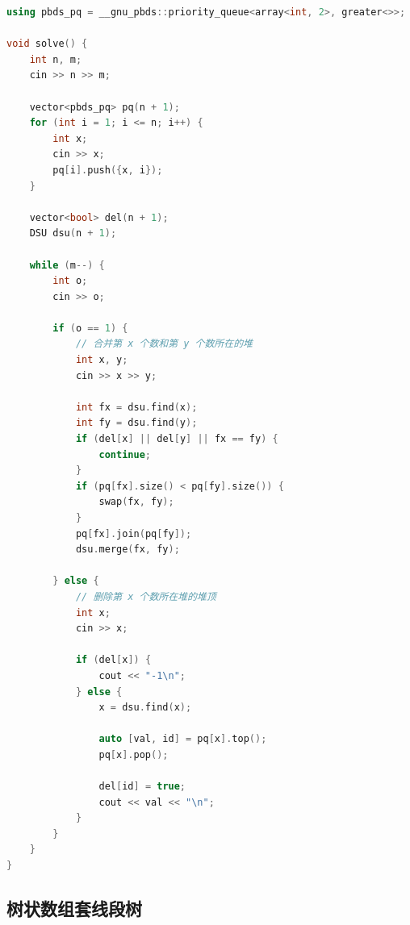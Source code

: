\begin{lstlisting}[language=C++]
using pbds_pq = __gnu_pbds::priority_queue<array<int, 2>, greater<>>;

void solve() {
    int n, m;
    cin >> n >> m;
    
    vector<pbds_pq> pq(n + 1);
    for (int i = 1; i <= n; i++) {
        int x;
        cin >> x;
        pq[i].push({x, i});
    }
    
    vector<bool> del(n + 1);
    DSU dsu(n + 1);

    while (m--) {
        int o;
        cin >> o;
        
        if (o == 1) {
            // 合并第 x 个数和第 y 个数所在的堆
            int x, y;
            cin >> x >> y;
            
            int fx = dsu.find(x);
            int fy = dsu.find(y);
            if (del[x] || del[y] || fx == fy) {
                continue;
            }
            if (pq[fx].size() < pq[fy].size()) {
                swap(fx, fy);
            }
            pq[fx].join(pq[fy]);
            dsu.merge(fx, fy);

        } else {
            // 删除第 x 个数所在堆的堆顶
            int x;
            cin >> x;

            if (del[x]) {
                cout << "-1\n";
            } else {
                x = dsu.find(x);

                auto [val, id] = pq[x].top();
                pq[x].pop();

                del[id] = true;
                cout << val << "\n";
            }
        }
    }
}
\end{lstlisting}

\subsection{树状数组套线段树}

